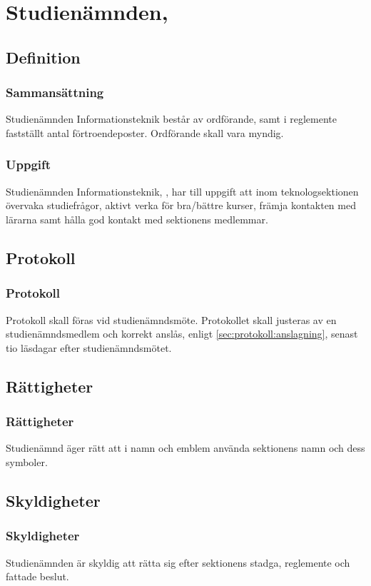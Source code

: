 \section{Studienämnden, \SNIT}

\subsection{Definition}

\subsubsection{Sammansättning}
Studienämnden Informationsteknik består av ordförande, samt i reglemente fastställt antal förtroendeposter. Ordförande skall vara myndig.

\subsubsection{Uppgift}
Studienämnden Informationsteknik, \SNIT{}, har till uppgift att inom teknologsektionen övervaka studiefrågor, aktivt verka för bra/bättre kurser, främja kontakten med lärarna samt hålla god kontakt med sektionens medlemmar.

\subsection{Protokoll}

\subsubsection{Protokoll}
Protokoll skall föras vid studienämndsmöte. Protokollet skall justeras av en studienämndsmedlem och korrekt anslås, enligt \ref{sec:protokoll:anslagning}, senast tio läsdagar efter studienämndsmötet.

\subsection{Rättigheter}

\subsubsection{Rättigheter}
Studienämnd äger rätt att i namn och emblem använda sektionens namn och dess symboler.

\subsection{Skyldigheter}

\subsubsection{Skyldigheter}
Studienämnden är skyldig att rätta sig efter sektionens stadga, reglemente och fattade beslut.